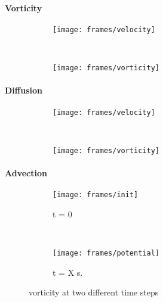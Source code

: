 \documentclass[a4paper,12pt,twoside]{article}
\begin{document}
\paragraph{Vorticity} 

\begin{figure}
	\begin{subfigure}[b]{0.48\textwidth}
		\texttt{[image: frames/velocity]}
	\end{subfigure}
	~
	\begin{subfigure}[b]{0.48\textwidth}
		\texttt{[image: frames/vorticity]}
	\end{subfigure}
\end{figure}

\paragraph{Diffusion}

\begin{figure}
	\begin{subfigure}[b]{0.48\textwidth}
		\texttt{[image: frames/velocity]}
	\end{subfigure}
	~
	\begin{subfigure}[b]{0.48\textwidth}
		\texttt{[image: frames/vorticity]}
	\end{subfigure}
\end{figure}

\paragraph{Advection}

\begin{figure}[h]
	\centering
	\begin{subfigure}[b]{0.48\textwidth}
		\texttt{[image: frames/init]}
		\caption{t = 0}
	\end{subfigure}
	~
	\begin{subfigure}[b]{0.48\textwidth}
		\texttt{[image: frames/potential]}
		\caption{t = X s.}
	\end{subfigure}
	\caption{vorticity at two different time steps}
	\label{fig:onetimestep}
\end{figure}
\end{document}
